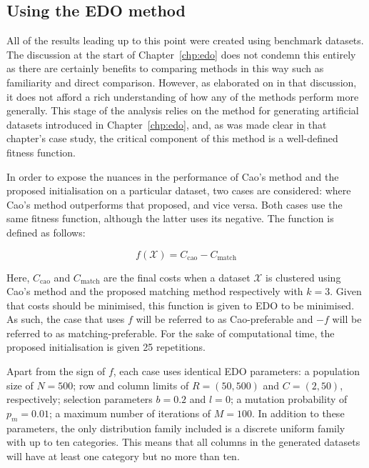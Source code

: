 \subsection{Using the EDO method}\label{subsec:artificial}

All of the results leading up to this point were created using benchmark
datasets. The discussion at the start of Chapter~\ref{chp:edo} does not condemn
this entirely as there are certainly benefits to comparing methods in this way
such as familiarity and direct comparison. However, as elaborated on in that
discussion, it does not afford a rich understanding of how any of the methods
perform more generally. This stage of the analysis relies on the method for
generating artificial datasets introduced in Chapter~\ref{chp:edo}, and, as was
made clear in that chapter's case study, the critical component of this method
is a well-defined fitness function.

In order to expose the nuances in the performance of Cao's method and the
proposed initialisation on a particular dataset, two cases are considered: where
Cao's method outperforms that proposed, and vice versa. Both cases use the same
fitness function, although the latter uses its negative. The function is defined
as follows:

\begin{equation}\label{eq:fitness}
    f\left(\mathcal X\right) = C_{\mathrm{cao}} - C_{\mathrm{match}}
\end{equation}

Here, \(C_{\mathrm{cao}}\) and \(C_{\mathrm{match}}\) are the final costs when a
dataset \(\mathcal X\) is clustered using Cao's method and the proposed matching
method respectively with \(k = 3\). Given that costs should be minimised, this
function is given to EDO to be minimised. As such, the case that uses \(f\) will
be referred to as Cao-preferable and \(-f\) will be referred to as
matching-preferable. For the sake of computational time, the proposed
initialisation is given 25 repetitions.

Apart from the sign of \(f\), each case uses identical EDO parameters: a
population size of \(N = 500\); row and column limits of \(R = (50, 500)\) and
\(C = (2, 50)\), respectively; selection parameters \(b = 0.2\) and \(l = 0\); a
mutation probability of \(p_m = 0.01\); a maximum number of iterations of \(M =
100\). In addition to these parameters, the only distribution family included is
a discrete uniform family with up to ten categories. This means that all columns
in the generated datasets will have at least one category but no more than ten.

